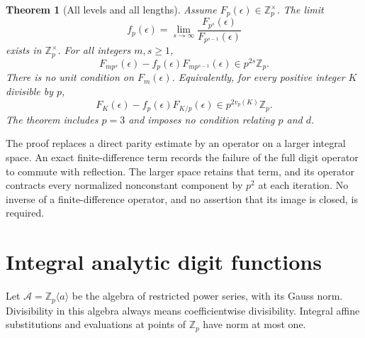 \documentclass[11pt,letterpaper]{article}
\newtheorem{theorem}{Theorem}[section]
\theoremstyle{definition}
\theoremstyle{remark}
\begin{document}
\begin{theorem}[All levels and all lengths]\label{II:bdx:main}
Assume $F_p(\epsilon)\in\mathbb Z_p^\times$.
The limit
\[
 f_p(\epsilon)=\lim_{s\to\infty}
       \frac{F_{p^s}(\epsilon)}{F_{p^{s-1}}(\epsilon)}
\]
exists in $\mathbb Z_p^\times$. For all integers $m,s\ge1$,
\begin{equation}\label{II:bdx:alllength}
 F_{mp^s}(\epsilon)-f_p(\epsilon)F_{mp^{s-1}}(\epsilon)
                      \in p^{2s}\mathbb Z_p.
\end{equation}
There is no unit condition on $F_m(\epsilon)$.
Equivalently, for every positive integer $K$ divisible by $p$,
\begin{equation}\label{II:bdx:allcutoff}
 F_K(\epsilon)-f_p(\epsilon)F_{K/p}(\epsilon)
                      \in p^{2v_p(K)}\mathbb Z_p.
\end{equation}
The theorem includes $p=3$ and imposes no condition relating $p$ and $d$.
\end{theorem}

The proof replaces a direct parity estimate by an operator on a larger
integral space. An exact finite-difference term records the failure of
the full digit operator to commute with reflection. The larger space
retains that term, and its operator contracts every normalized
nonconstant component by $p^2$ at each iteration. No inverse of a
finite-difference operator, and no assertion that its image is closed,
is required.

\section{Integral analytic digit functions}

Let $\mathcal A=\mathbb Z_p\langle a\rangle$ be the algebra of restricted
power series, with its Gauss norm. Divisibility in this algebra always
means coefficientwise divisibility. Integral affine substitutions and
evaluations at points of $\mathbb Z_p$ have norm at most one.
\end{document}

